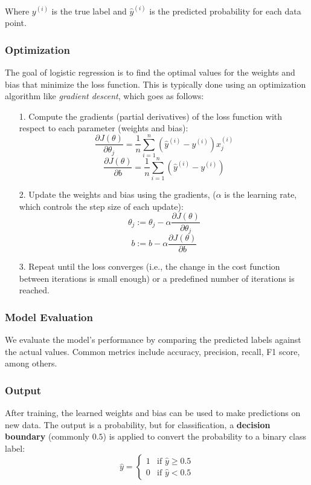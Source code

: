 \documentclass{article}
\theoremstyle{plain}
\theoremstyle{definition}
\theoremstyle{remark}
\begin{document}
Where $y^{(i)}$ is the true label and $\hat{y}^{(i)}$ is the predicted probability for each data point.


\subsubsection{Optimization}

The goal of logistic regression is to find the optimal values for the weights and bias that minimize the loss function. This is typically done using an optimization algorithm like \textit{gradient descent}, which goes as follows:

\begin{itemize}

\item[1.] Compute the gradients (partial derivatives) of the loss function with respect to each parameter (weights and bias):
$$
\frac{\partial J(\theta)}{\partial \theta_j} = \frac{1}{n} \sum_{i=1}^{n} \left( \hat{y}^{(i)} - y^{(i)} \right) x_j^{(i)}
$$
$$
\frac{\partial J(\theta)}{\partial b} = \frac{1}{n} \sum_{i=1}^{n} \left( \hat{y}^{(i)} - y^{(i)} \right)
$$

\item[2.] Update the weights and bias using the gradients, ($\alpha$ is the learning rate, which controls the step size of each update):
$$
\theta_j := \theta_j - \alpha \frac{\partial J(\theta)}{\partial \theta_j}
$$
$$
b := b - \alpha \frac{\partial J(\theta)}{\partial b}
$$

\item[3.] Repeat until the loss converges (i.e., the change in the cost function between iterations is small enough) or a predefined number of iterations is reached.

\end{itemize}


\subsubsection{Model Evaluation}

We evaluate the model’s performance by comparing the predicted labels against the actual values. Common metrics include accuracy, precision, recall, F1 score, among others.


\subsubsection{Output}

After training, the learned weights and bias can be used to make predictions on new data. The output is a probability, but for classification, a \textbf{decision boundary} (commonly $0.5$) is applied to convert the probability to a binary class label:
$$
\hat{y} = \begin{cases}
1 & \text{if } \hat{y} \geq 0.5 \\
0 & \text{if } \hat{y} < 0.5
\end{cases}
$$
\end{document}
